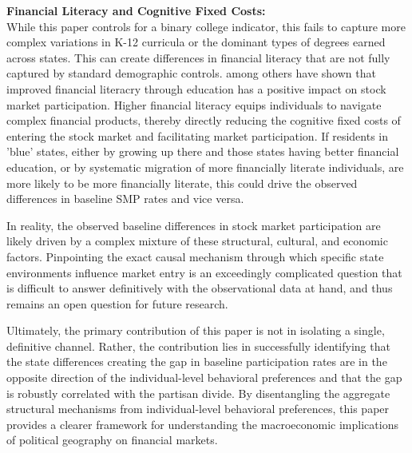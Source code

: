 \vspace{1em}
\noindent\textbf{Financial Literacy and Cognitive Fixed Costs:}\\[0.5em]
While this paper controls for a binary college indicator, this fails to capture more complex variations in K-12 curricula or the dominant types of degrees earned across states. This can create differences in financial literacy that are not fully captured by standard demographic controls. \citet{vanrooij2011, bernheim2001, bernheim2003} among others have shown that improved financial literacry through education has a positive impact on stock market participation. Higher financial literacy equips individuals to navigate complex financial products, thereby directly reducing the cognitive fixed costs of entering the stock market and facilitating market participation. If residents in 'blue' states, either by growing up there and those states having better financial education, or by systematic migration of more financially literate individuals, are more likely to be more financially literate, this could drive the observed differences in baseline SMP rates and vice versa.

\vspace{2em}

In reality, the observed baseline differences in stock market participation are likely driven by a complex mixture of these structural, cultural, and economic factors. Pinpointing the exact causal mechanism through which specific state environments influence market entry is an exceedingly complicated question that is difficult to answer definitively with the observational data at hand, and thus remains an open question for future research.

Ultimately, the primary contribution of this paper is not in isolating a single, definitive channel. Rather, the contribution lies in successfully identifying that the state differences creating the gap in baseline participation rates are in the opposite direction of the individual-level behavioral preferences and that the gap is robustly correlated with the partisan divide. By disentangling the aggregate structural mechanisms from individual-level behavioral preferences, this paper provides a clearer framework for understanding the macroeconomic implications of political geography on financial markets.

